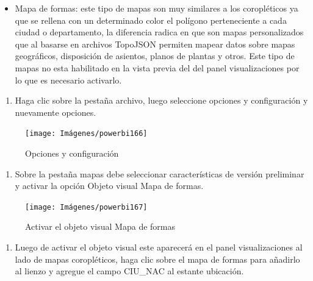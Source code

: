 \documentclass[
]{book}
\providecommand{\tightlist}{%
  \setlength{\itemsep}{0pt}\setlength{\parskip}{0pt}}
\begin{document}
\begin{itemize}
\tightlist
\item
  Mapa de formas: este tipo de mapas son muy similares a los coropléticos ya que se rellena con un determinado color el polígono perteneciente a cada ciudad o departamento, la diferencia radica en que son mapas personalizados que al basarse en archivos TopoJSON permiten mapear datos sobre mapas geográficos, disposición de asientos, planos de plantas y otros. Este tipo de mapas no esta habilitado en la vista previa del del panel visualizaciones por lo que es necesario activarlo.
\end{itemize}

\begin{enumerate}
\def\labelenumi{\arabic{enumi}.}
\tightlist
\item
  Haga clic sobre la pestaña archivo, luego seleccione opciones y configuración y nuevamente opciones.
\end{enumerate}

\begin{figure}

{\centering \texttt{[image: Imágenes/powerbi166]} 

}

\caption{Opciones y configuración}\label{fig:paso1mapadeformas-fig}
\end{figure}

\begin{enumerate}
\def\labelenumi{\arabic{enumi}.}
\setcounter{enumi}{1}
\tightlist
\item
  Sobre la pestaña mapas debe seleccionar características de versión preliminar y activar la opción Objeto visual Mapa de formas.
\end{enumerate}

\begin{figure}

{\centering \texttt{[image: Imágenes/powerbi167]} 

}

\caption{Activar el objeto visual Mapa de formas}\label{fig:paso2mapadeformas-fig}
\end{figure}

\begin{enumerate}
\def\labelenumi{\arabic{enumi}.}
\setcounter{enumi}{2}
\tightlist
\item
  Luego de activar el objeto visual este aparecerá en el panel visualizaciones al lado de mapas coropléticos, haga clic sobre el mapa de formas para añadirlo al lienzo y agregue el campo CIU\_NAC al estante ubicación.
\end{enumerate}
\end{document}
